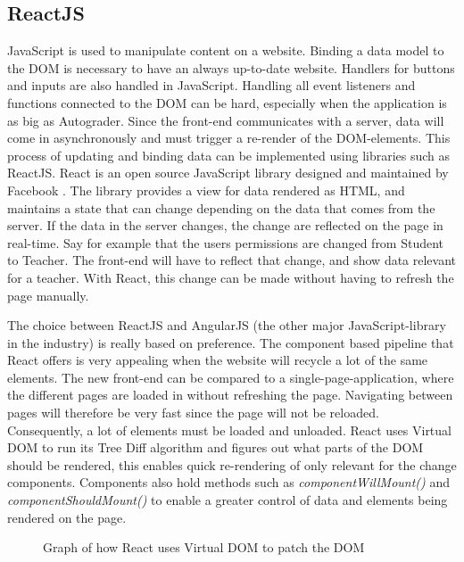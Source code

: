 \subsection{ReactJS}
JavaScript is used to manipulate content on a website. Binding a data model to the DOM is necessary to have an always up-to-date website. Handlers for buttons and inputs are also handled in JavaScript. Handling all event listeners and functions connected to the DOM can be hard, especially when the application is as big as Autograder. Since the front-end communicates with a server, data will come in asynchronously and must trigger a re-render of the DOM-elements. This process of updating and binding data can be implemented using libraries such as ReactJS. React is an open source JavaScript library designed and maintained by Facebook \cite{facebookreact} . The library provides a view for data rendered as HTML, and maintains a state that can change depending on the data that comes from the server. If the data in the server changes, the change are reflected on the page in real-time. Say for example that the users permissions are changed from Student to Teacher. The front-end will have to reflect that change, and show data relevant for a teacher. With React, this change can be made without having to refresh the page manually. 

The choice between ReactJS and AngularJS (the other major JavaScript-library in the industry) is really based on preference. The component based pipeline that React offers is very appealing when the website will recycle a lot of the same elements. The new front-end can be compared to a single-page-application, where the different pages are loaded in without refreshing the page. Navigating between pages will therefore be very fast since the page will not be reloaded. Consequently, a lot of elements must be loaded and unloaded. React uses Virtual DOM to run its Tree Diff algorithm \cite{reacttreediff} and figures out what parts of the DOM should be rendered, this enables quick re-rendering of only relevant for the change components. Components also hold methods such as \emph{componentWillMount()} and \emph{componentShouldMount()} to enable a greater control of data and elements being rendered on the page.

\begin{figure}[h]
\centering
\scalebox{0.5}{{}}
\caption{Graph of how React uses Virtual DOM to patch the DOM}
\end{figure}

